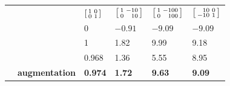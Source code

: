 \documentclass[\ifafour a4paper,12pt,\else a5paper,10pt,\fi%
onecolumn,oneside,article,%
british%
]{memoir}
\theoremstyle{remark}
\theoremstyle{innote}
\renewcommand*{\|}[1][]{\nonscript\:#1\vert\nonscript\:\mathopen{}}
\newcommand*{\sumatrix}[4]{\begin{bsmallmatrix*}[r]#1&#2\\#3&#4\end{bsmallmatrix*}}
\begin{document}
\begin{table}[!p]
%
  \begin{tabular*}{\linewidth}{clw{c}{0.12\linewidth}w{c}{0.12\linewidth}w{c}{0.12\linewidth}w{c}{0.12\linewidth}}
&    &$\sumatrix{1}{0}{0}{1}$
 &$\sumatrix{1}{-10}{0}{10}$
 &$\sumatrix{1}{-100}{0}{100}$
 &$\sumatrix{10}{0}{-10}{1}$
     \\[2\jot]
 &\parbox{0.21\linewidth}{}
 &\textcolor{mygray}{\footnotesize 0}
 &\textcolor{mygray}{\footnotesize $-0.91$}
 &\textcolor{mygray}{\footnotesize $-9.09$}
 &\textcolor{mygray}{\footnotesize $-9.09$}
     \\[0\jot]
 &\parbox{0.21\linewidth}{}
 &\textcolor{mygray}{\footnotesize 1}
 &\textcolor{mygray}{\footnotesize 1.82}
 &\textcolor{mygray}{\footnotesize 9.99}
 &\textcolor{mygray}{\footnotesize 9.18}
    \\[5\jot]
 &\parbox{0.21\linewidth}{\color{myred}}
 &\textcolor{myred}{0.968}
 &\textcolor{myred}{1.36}
 &\textcolor{myred}{5.55}
 &\textcolor{myred}{8.95}
 \\[1\jot]
 &\parbox{0.21\linewidth}{\color{mypurpleblue}\bfseries augmentation}
 &\textcolor{mypurpleblue}{\bfseries 0.974}
 &\textcolor{mypurpleblue}{\bfseries 1.72}
 &\textcolor{mypurpleblue}{\bfseries 9.63}
 &\textcolor{mypurpleblue}{\bfseries 9.09}
 \\[5\jot]

\end{tabular*}
\end{table}
\end{document}
